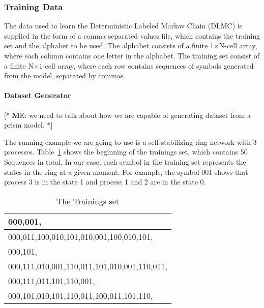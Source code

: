 \documentclass[
a4paper,
12pt
]{scrartcl}
\newcommand\me[1]{ [* {\textbf ME:} #1 *]}
\begin{document}
\begin{figure}[H]
\begin{center}
\end{center}
     \label{fig:diaAalergia}
\end{figure}

\subsubsection{Training Data}
The data used to learn the Deterministic Labeled Markov Chain (DLMC) is supplied in the form of a comma separated values file, which contains the training set and the alphabet to be used. The alphabet consists of a finite 1$\times$N-cell array, where each column contains one letter in the alphabet. The training set consist of a finite N$\times$1-cell array, where each row contains sequences of symbols generated from the model, separated by commas.
\paragraph{Dataset Generator} \me{we need to talk about how we are capable of generating dataset from a prism model.}
\par The running example we are going to use is a self-stabilizing ring network with 3 processes.
Table~\ref{table:trainingsSet} shows the beginning of the trainings set, which contains 50 Sequences in total.  In our case, each symbol in the training set represents the states in the ring at a given moment. For example, the symbol 001 shows that process 3 is in the state 1 and process 1 and 2 are in the state 0.

\begin{table}[ht!]
\centering
\begin{tabular}{|l|}
\hline
000,001,                                    \\ \hline
000,011,100,010,101,010,001,100,010,101,   \\ \hline
000,101,                                    \\ \hline
000,111,010,001,110,011,101,010,001,110,011, \\ \hline
000,111,011,101,110,001,                    \\ \hline
000,101,010,101,110,011,100,011,101,110,    \\ \hline
\end{tabular}
\caption{The Trainings set}
\label{table:trainingsSet}
\end{table}
\end{document}
